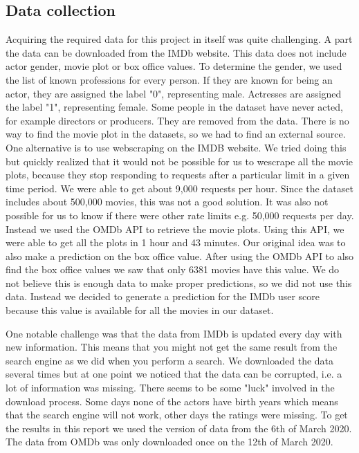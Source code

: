 
\subsection{Data collection}

Acquiring the required data for this project in itself was quite challenging. A part the data can be downloaded from the IMDb website\cite{IMDbInterfaces}. This data does not include actor gender, movie plot or box office values. To determine the gender, we used the list of known professions for every person. If they are known for being an actor, they are assigned the label "0", representing male. Actresses are assigned the label "1", representing female. Some people in the dataset have never acted, for example directors or producers. They are removed from the data. There is no way to find the movie plot in the datasets, so we had to find an external source. One alternative is to use webscraping on the IMDB website. We tried doing this but quickly realized that it would not be possible for us to wescrape all the movie plots, because they stop responding to requests after a particular limit in a given time period. We were able to get about 9,000 requests per hour. Since the dataset includes about 500,000 movies, this was not a good solution. It was also not possible for us to know if there were other rate limits e.g. 50,000 requests per day. Instead we used the OMDb API\cite{OMDb} to retrieve the movie plots. Using this API, we were able to get all the plots in 1 hour and 43 minutes. Our original idea was to also make a prediction on the box office value. After using the OMDb API to also find the box office values we saw that only 6381 movies have this value. We do not believe this is enough data to make proper predictions, so we did not use this data. Instead we decided to generate a prediction for the IMDb user score because this value is available for all the movies in our dataset.

One notable challenge was that the data from IMDb is updated every day with new information. This means that you might not get the same result from the search engine as we did when you perform a search. We downloaded the data several times but at one point we noticed that the data can be corrupted, i.e. a lot of information was missing. There seems to be some "luck" involved in the download process. Some days none of the actors have birth years which means that the search engine will not work, other days the ratings were missing. To get the results in this report we used the version of data from the 6th of March 2020. The data from OMDb was only downloaded once on the 12th of March 2020.


